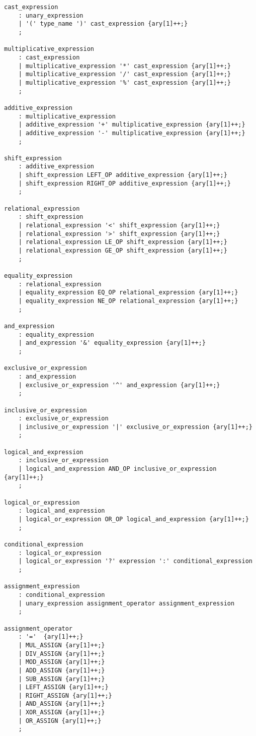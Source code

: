 \documentclass{article}
\begin{document}
\begin{lstlisting}
cast_expression
	: unary_expression
	| '(' type_name ')' cast_expression {ary[1]++;} 
	;

multiplicative_expression
	: cast_expression
	| multiplicative_expression '*' cast_expression {ary[1]++;}
	| multiplicative_expression '/' cast_expression {ary[1]++;}
	| multiplicative_expression '%' cast_expression {ary[1]++;}
	;

additive_expression
	: multiplicative_expression
	| additive_expression '+' multiplicative_expression {ary[1]++;}
	| additive_expression '-' multiplicative_expression {ary[1]++;}
	;

shift_expression
	: additive_expression
	| shift_expression LEFT_OP additive_expression {ary[1]++;}
	| shift_expression RIGHT_OP additive_expression {ary[1]++;}
	;

relational_expression
	: shift_expression
	| relational_expression '<' shift_expression {ary[1]++;}
	| relational_expression '>' shift_expression {ary[1]++;}
	| relational_expression LE_OP shift_expression {ary[1]++;}
	| relational_expression GE_OP shift_expression {ary[1]++;}
	;

equality_expression
	: relational_expression
	| equality_expression EQ_OP relational_expression {ary[1]++;}
	| equality_expression NE_OP relational_expression {ary[1]++;}
	;

and_expression
	: equality_expression
	| and_expression '&' equality_expression {ary[1]++;}
	;

exclusive_or_expression
	: and_expression
	| exclusive_or_expression '^' and_expression {ary[1]++;}
	;

inclusive_or_expression
	: exclusive_or_expression
	| inclusive_or_expression '|' exclusive_or_expression {ary[1]++;}
	;

logical_and_expression
	: inclusive_or_expression
	| logical_and_expression AND_OP inclusive_or_expression {ary[1]++;}
	;

logical_or_expression
	: logical_and_expression
	| logical_or_expression OR_OP logical_and_expression {ary[1]++;}
	;

conditional_expression
	: logical_or_expression
	| logical_or_expression '?' expression ':' conditional_expression
	;

assignment_expression
	: conditional_expression
	| unary_expression assignment_operator assignment_expression
	;

assignment_operator
	: '='  {ary[1]++;}
	| MUL_ASSIGN {ary[1]++;}
	| DIV_ASSIGN {ary[1]++;}
	| MOD_ASSIGN {ary[1]++;}
	| ADD_ASSIGN {ary[1]++;}
	| SUB_ASSIGN {ary[1]++;}
	| LEFT_ASSIGN {ary[1]++;}
	| RIGHT_ASSIGN {ary[1]++;}
	| AND_ASSIGN {ary[1]++;}
	| XOR_ASSIGN {ary[1]++;}
	| OR_ASSIGN {ary[1]++;}
	;


\end{lstlisting}
\end{document}

